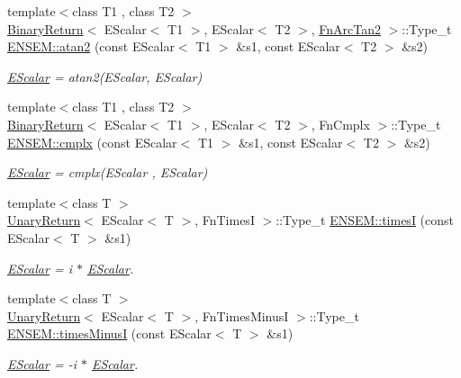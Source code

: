 \begin{DoxyCompactItemize}
{\footnotesize template$<$class T1 , class T2 $>$ }\\\mbox{\hyperlink{structBinaryReturn}{Binary\+Return}}$<$ E\+Scalar$<$ T1 $>$, E\+Scalar$<$ T2 $>$, \mbox{\hyperlink{structFnArcTan2}{Fn\+Arc\+Tan2}} $>$\+::Type\+\_\+t \mbox{\hyperlink{group__escalar_ga9a9d48948d119981259ad0ebcb0acfea}{E\+N\+S\+E\+M\+::atan2}} (const E\+Scalar$<$ T1 $>$ \&s1, const E\+Scalar$<$ T2 $>$ \&s2)
\begin{DoxyCompactList}\small\item\em \mbox{\hyperlink{classENSEM_1_1EScalar}{E\+Scalar}} = atan2(\+E\+Scalar, E\+Scalar) \end{DoxyCompactList}\item 
{\footnotesize template$<$class T1 , class T2 $>$ }\\\mbox{\hyperlink{structBinaryReturn}{Binary\+Return}}$<$ E\+Scalar$<$ T1 $>$, E\+Scalar$<$ T2 $>$, Fn\+Cmplx $>$\+::Type\+\_\+t \mbox{\hyperlink{group__escalar_gaccbb7d66b912e8f0972f4e50095f296e}{E\+N\+S\+E\+M\+::cmplx}} (const E\+Scalar$<$ T1 $>$ \&s1, const E\+Scalar$<$ T2 $>$ \&s2)
\begin{DoxyCompactList}\small\item\em \mbox{\hyperlink{classENSEM_1_1EScalar}{E\+Scalar}} = cmplx(\+E\+Scalar , E\+Scalar) \end{DoxyCompactList}\item 
{\footnotesize template$<$class T $>$ }\\\mbox{\hyperlink{structUnaryReturn}{Unary\+Return}}$<$ E\+Scalar$<$ T $>$, Fn\+TimesI $>$\+::Type\+\_\+t \mbox{\hyperlink{group__escalar_gab216ba6f292c204a04e5ff6cd34c32c3}{E\+N\+S\+E\+M\+::timesI}} (const E\+Scalar$<$ T $>$ \&s1)
\begin{DoxyCompactList}\small\item\em \mbox{\hyperlink{classENSEM_1_1EScalar}{E\+Scalar}} = i $\ast$ \mbox{\hyperlink{classENSEM_1_1EScalar}{E\+Scalar}}. \end{DoxyCompactList}\item 
{\footnotesize template$<$class T $>$ }\\\mbox{\hyperlink{structUnaryReturn}{Unary\+Return}}$<$ E\+Scalar$<$ T $>$, Fn\+Times\+MinusI $>$\+::Type\+\_\+t \mbox{\hyperlink{group__escalar_gaf2675acd80a7a861cff22098e403837a}{E\+N\+S\+E\+M\+::times\+MinusI}} (const E\+Scalar$<$ T $>$ \&s1)
\begin{DoxyCompactList}\small\item\em \mbox{\hyperlink{classENSEM_1_1EScalar}{E\+Scalar}} = -\/i $\ast$ \mbox{\hyperlink{classENSEM_1_1EScalar}{E\+Scalar}}. \end{DoxyCompactList}\item 

\end{DoxyCompactItemize}
